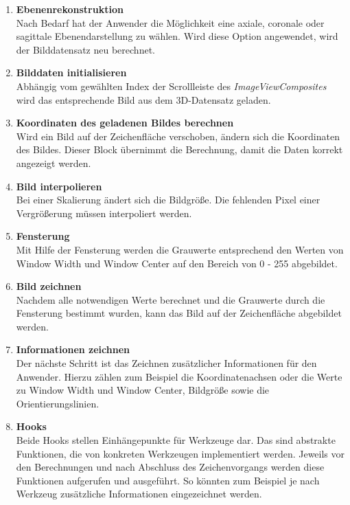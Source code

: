 \begin{enumerate}
\item \textbf{Ebenenrekonstruktion}\\
	Nach Bedarf hat der Anwender die Möglichkeit eine axiale, coronale oder sagittale Ebenendarstellung zu wählen. Wird diese Option angewendet, wird der Bilddatensatz neu berechnet.
\item \textbf{Bilddaten initialisieren}\\
	Abhängig vom gewählten Index der Scrollleiste des \textit{ImageViewComposites} wird das entsprechende Bild aus dem 3D-Datensatz geladen.
\item \textbf{Koordinaten des geladenen Bildes berechnen}\\
	Wird ein Bild auf der Zeichenfläche verschoben, ändern sich die Koordinaten des Bildes. Dieser Block übernimmt die Berechnung, damit die Daten korrekt angezeigt werden.
\item \textbf{Bild interpolieren}\\
	Bei einer Skalierung ändert sich die Bildgröße. Die fehlenden Pixel einer Vergrößerung müssen interpoliert werden.
	
\pagebreak
\item \textbf{Fensterung}\\
	Mit Hilfe der Fensterung werden die Grauwerte entsprechend den Werten von Window Width und Window Center auf den Bereich von 0 - 255 abgebildet.
\item \textbf{Bild zeichnen}\\
	Nachdem alle notwendigen Werte berechnet und die Grauwerte durch die Fensterung bestimmt wurden, kann das Bild auf der Zeichenfläche abgebildet werden.
\item \textbf{Informationen zeichnen}\\
	Der nächste Schritt ist das Zeichnen zusätzlicher Informationen für den Anwender. Hierzu zählen zum Beispiel die Koordinatenachsen oder die Werte zu Window Width und Window Center, Bildgröße sowie die Orientierungslinien.
\item \textbf{Hooks}\\
	Beide Hooks stellen Einhängepunkte für Werkzeuge dar. Das sind abstrakte Funktionen, die von konkreten Werkzeugen implementiert werden. Jeweils vor den Berechnungen und nach Abschluss des Zeichenvorgangs werden diese Funktionen aufgerufen und ausgeführt. So könnten zum Beispiel je nach Werkzeug zusätzliche Informationen eingezeichnet werden.
\end{enumerate}

